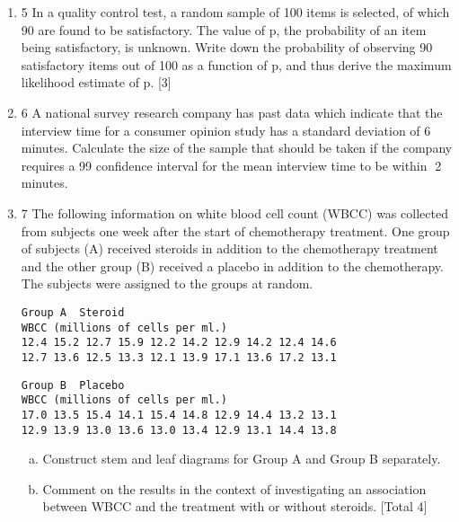 \documentclass[a4paper,12pt]{article}
\begin{document}
\begin{enumerate}
\item 5 In a quality control test, a random sample of 100 items is selected, of which 90 are
found to be satisfactory. The value of p, the probability of an item being satisfactory,
is unknown.
Write down the probability of observing 90 satisfactory items out of 100 as a function
of p, and thus derive the maximum likelihood estimate of p. [3]
\item 6 A national survey research company has past data which indicate that the interview
time for a consumer opinion study has a standard deviation of 6 minutes.
Calculate the size of the sample that should be taken if the company requires a 99%
confidence interval for the mean interview time to be within 2 minutes. 
\item 7 The following information on white blood cell count (WBCC) was collected from
subjects one week after the start of chemotherapy treatment. One group of subjects
(A) received steroids in addition to the chemotherapy treatment and the other group
(B) received a placebo in addition to the chemotherapy. The subjects were assigned
to the groups at random.
\begin{verbatim}
Group A  Steroid
WBCC (millions of cells per ml.)
12.4 15.2 12.7 15.9 12.2 14.2 12.9 14.2 12.4 14.6
12.7 13.6 12.5 13.3 12.1 13.9 17.1 13.6 17.2 13.1
\end{verbatim}

\begin{verbatim}
Group B  Placebo
WBCC (millions of cells per ml.)
17.0 13.5 15.4 14.1 15.4 14.8 12.9 14.4 13.2 13.1
12.9 13.9 13.0 13.6 13.0 13.4 12.9 13.1 14.4 13.8  
\end{verbatim}

\begin{enumerate}[(a)]
\item Construct stem and leaf diagrams for Group A and Group B separately. 
\item Comment on the results in the context of investigating an association between
WBCC and the treatment with or without steroids. 
[Total 4]
\end{enumerate}



\end{enumerate}
\end{document}
